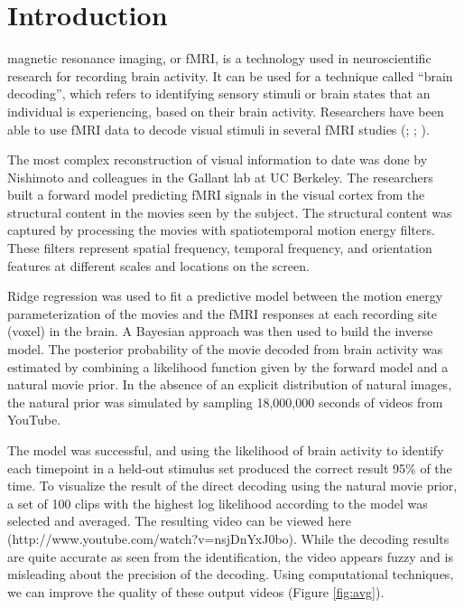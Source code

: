 
\section{Introduction}
 magnetic resonance imaging, or fMRI, is a technology used in neuroscientific research for recording brain activity. It can be used for a technique called ``brain decoding'', which refers to identifying sensory stimuli or brain states that an individual is experiencing, based on their brain activity. Researchers have been able to use fMRI data to decode visual stimuli in several fMRI studies (\cite{Kamitani}; \cite{Naselaris}; \cite{Nishimoto}).

The most complex reconstruction of visual information to date was done by Nishimoto and colleagues in the Gallant lab at UC Berkeley. The researchers built a forward model predicting fMRI signals in the visual cortex from the structural content in the movies seen by the subject. The structural content was captured by processing the movies with spatiotemporal motion energy filters. These filters represent spatial frequency, temporal frequency, and orientation features at different scales and locations on the screen. 

Ridge regression was used to fit a predictive model between the motion energy parameterization of the movies and the fMRI responses at each recording site (voxel) in the brain. A Bayesian approach was then used to build the inverse model. The posterior probability of the movie decoded from brain activity was estimated by combining a likelihood function given by the forward model and a natural movie prior. In the absence of an explicit distribution of natural images, the natural prior was simulated by sampling 18,000,000 seconds of videos from YouTube.

The model was successful, and using the likelihood of brain activity to identify each timepoint in a held-out stimulus set produced the correct result 95\% of the time. To visualize the result of the direct decoding using the natural movie prior, a set of 100 clips with the highest log likelihood according to the model was selected and averaged. The resulting video can be viewed here (http://www.youtube.com/watch?v=nsjDnYxJ0bo). While the decoding results are quite accurate as seen from the identification, the video appears fuzzy and is misleading about the precision of the decoding. Using computational techniques, we can improve the quality of these output videos (Figure \ref{fig:avg}).


